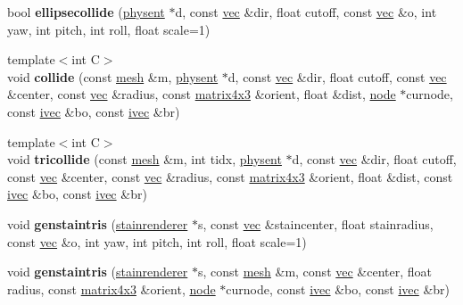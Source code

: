 \begin{DoxyCompactItemize}
bool {\bfseries ellipsecollide} (\hyperlink{structphysent}{physent} $\ast$d, const \hyperlink{structvec}{vec} \&dir, float cutoff, const \hyperlink{structvec}{vec} \&o, int yaw, int pitch, int roll, float scale=1)
\item 
\mbox{\label{struct_b_i_h_a99c9594d69e05f8a3573a68e7beb042b}} 
{\footnotesize template$<$int C$>$ }\\void {\bfseries collide} (const \hyperlink{struct_b_i_h_1_1mesh}{mesh} \&m, \hyperlink{structphysent}{physent} $\ast$d, const \hyperlink{structvec}{vec} \&dir, float cutoff, const \hyperlink{structvec}{vec} \&center, const \hyperlink{structvec}{vec} \&radius, const \hyperlink{structmatrix4x3}{matrix4x3} \&orient, float \&dist, \hyperlink{struct_b_i_h_1_1node}{node} $\ast$curnode, const \hyperlink{structivec}{ivec} \&bo, const \hyperlink{structivec}{ivec} \&br)
\item 
\mbox{\label{struct_b_i_h_a7ece631d54709a1994c72cfa10431a24}} 
{\footnotesize template$<$int C$>$ }\\void {\bfseries tricollide} (const \hyperlink{struct_b_i_h_1_1mesh}{mesh} \&m, int tidx, \hyperlink{structphysent}{physent} $\ast$d, const \hyperlink{structvec}{vec} \&dir, float cutoff, const \hyperlink{structvec}{vec} \&center, const \hyperlink{structvec}{vec} \&radius, const \hyperlink{structmatrix4x3}{matrix4x3} \&orient, float \&dist, const \hyperlink{structivec}{ivec} \&bo, const \hyperlink{structivec}{ivec} \&br)
\item 
\mbox{\label{struct_b_i_h_a69f1ea447e1bc18744a61e09f270c268}} 
void {\bfseries genstaintris} (\hyperlink{structstainrenderer}{stainrenderer} $\ast$s, const \hyperlink{structvec}{vec} \&staincenter, float stainradius, const \hyperlink{structvec}{vec} \&o, int yaw, int pitch, int roll, float scale=1)
\item 
\mbox{\label{struct_b_i_h_a1b1edd7f4c38ea2be0c5ab8135d2284b}} 
void {\bfseries genstaintris} (\hyperlink{structstainrenderer}{stainrenderer} $\ast$s, const \hyperlink{struct_b_i_h_1_1mesh}{mesh} \&m, const \hyperlink{structvec}{vec} \&center, float radius, const \hyperlink{structmatrix4x3}{matrix4x3} \&orient, \hyperlink{struct_b_i_h_1_1node}{node} $\ast$curnode, const \hyperlink{structivec}{ivec} \&bo, const \hyperlink{structivec}{ivec} \&br)
\item 

\end{DoxyCompactItemize}
